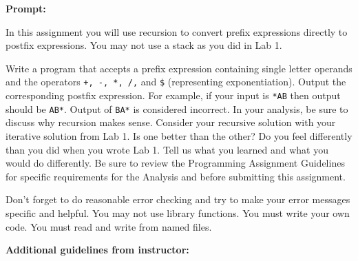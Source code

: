 \documentclass[10pt,letterpaper,final]{report}
\begin{document}
\begin{center}
  \vline
\end{center}

\noindent\textbf{Prompt:}

In this assignment you will use recursion to convert prefix expressions directly to postfix expressions. You may not use a stack as you did in Lab 1.

Write a program that accepts a prefix expression containing single letter operands and the operators \texttt{+, -, *, /,} and \texttt{\$} (representing exponentiation). Output the corresponding postfix expression.  For example, if your input is \texttt{*AB} then output should be \texttt{AB*}. Output of \texttt{BA*} is considered incorrect. In your analysis, be sure to discuss why recursion makes sense. Consider your recursive solution with your iterative solution from Lab 1. Is one better than the other? Do you feel differently than you did when you wrote Lab 1. Tell us what you learned and what you would do differently. Be sure to review the Programming Assignment Guidelines for specific requirements for the Analysis and before submitting this assignment.

Don't forget to do reasonable error checking and try to make your error messages specific and helpful. You may not use library functions. You must write your own code. You must read and write from named files.

\noindent \textbf{Additional guidelines from instructor:}
\end{document}
